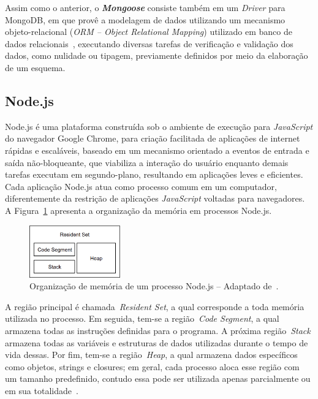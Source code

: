 \documentclass[12pt]{article}
\begin{document}
Assim como o anterior, o \textbf{\textit{Mongoose}} consiste também em um \emph{Driver} para MongoDB, em que provê a modelagem de dados utilizando um mecanismo objeto-relacional (\emph{ORM -- Object Relational Mapping}) utilizado em banco de dados relacionais~\cite{mardan2014boosting}, executando diversas tarefas de verificação e validação dos dados, como nulidade ou tipagem, previamente definidos por meio da elaboração de um esquema.

\subsection{Node.js}
\label{subsection:nodejs}

Node.js é uma plataforma construída sob o ambiente de execução para \textit{JavaScript} do navegador Google Chrome, para criação facilitada de aplicações de internet rápidas e escaláveis, baseado em um mecanismo orientado a eventos de entrada e saída não-bloqueante, que viabiliza a interação do usuário enquanto demais tarefas executam em segundo-plano, resultando em aplicações leves e eficientes.
Cada aplicação Node.js atua como processo comum em um computador, diferentemente da restrição de aplicações \textit{JavaScript} voltadas para navegadores. A Figura~\ref{figure:memoria} apresenta a organização da memória em processos Node.js.

\begin{figure}[!h]
    \centering
    \includegraphics[width=0.35\textwidth]{images/set}
    \caption{Organização de memória de um processo Node.js -- Adaptado de~\cite{nodememory}.}
    \label{figure:memoria}
\end{figure} 

A região principal é chamada~\emph{Resident Set}, a qual corresponde a toda memória utilizada no processo. Em seguida, tem-se a região~\emph{Code Segment}, a qual armazena todas as instruções definidas para o programa. A próxima região~\emph{Stack} armazena todas as variáveis e estruturas de dados utilizadas durante o tempo de vida dessas. Por fim, tem-se a região~\emph{Heap}, a qual armazena dados específicos como objetos, strings e closures; em geral, cada processo aloca esse região com um tamanho predefinido, contudo essa pode ser utilizada apenas parcialmente ou em sua totalidade~\cite{nodememory}. 
\end{document}
